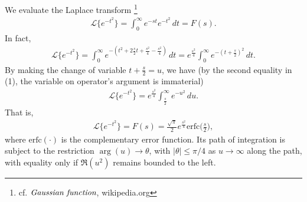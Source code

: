 \documentclass[12pt]{article}
\begin{document}
We evaluate the Laplace transform
{\footnote{cf. $\emph{Gaussian function}$, wikipedia.org}}
\begin{align}
\mathcal{L}\{e^{-t^2}\}=\int_0^\infty e^{-st}e^{-t^2}\,dt=F(s).
\end{align}
In fact,
\begin{align*}
\mathcal{L}\{e^{-t^2}\}=
\int_0^\infty e^{-(t^2+2\frac{s}{2}t+\frac{s^2}{4}-\frac{s^2}{4})}\,dt=
e^\frac{s^2}{4}\!\!\int_0^\infty e^{-(t+\frac{s}{2})^2}\,dt.
\end{align*}
By making the change of variable $t+\frac{s}{2}=u$, we have (by the second equality in (1), the variable on operator's argument is immaterial)
\begin{align*}
\mathcal{L}\{e^{-t^2}\}=
e^\frac{s^2}{4}\!\!\int_{\frac{s}{2}}^\infty e^{-u^2}\,du.
\end{align*}
That is,
\begin{align*}
\mathcal{L}\{e^{-t^2}\}=F(s)=
\frac{\sqrt{\pi}}{2}e^\frac{s^2}{4}\mathrm{erfc}\Big(\frac{s}{2}\Big),
\end{align*}
where $\mathrm{erfc}(\cdot)$ is the complementary error function. Its path of integration is subject to the restriction $\arg{(u)}\to\theta$, with
$|\theta|\leq\pi/4$ as $u\to\infty$ along the path, with equality only if $\Re{(u^2)}$ remains bounded to the left.

\end{document}
